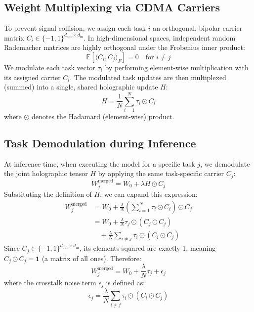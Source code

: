 \documentclass{article}
\begin{document}
\subsection{Weight Multiplexing via CDMA Carriers}
To prevent signal collision, we assign each task $i$ an orthogonal, bipolar carrier matrix $C_i \in \{-1, 1\}^{d_{\text{out}} \times d_{\text{in}}}$. In high-dimensional spaces, independent random Rademacher matrices are highly orthogonal under the Frobenius inner product:
\begin{equation}
    \mathbb{E}[\langle C_i, C_j \rangle_F] = 0 \quad \text{for } i \neq j
\end{equation}
We modulate each task vector $\tau_i$ by performing element-wise multiplication with its assigned carrier $C_i$. The modulated task updates are then multiplexed (summed) into a single, shared holographic update $H$:
\begin{equation}
    H = \frac{1}{N} \sum_{i=1}^N \tau_i \odot C_i
\end{equation}
where $\odot$ denotes the Hadamard (element-wise) product.

\subsection{Task Demodulation during Inference}
At inference time, when executing the model for a specific task $j$, we demodulate the joint holographic tensor $H$ by applying the same task-specific carrier $C_j$:
\begin{equation}
    W_j^{\text{merged}} = W_0 + \lambda H \odot C_j
\end{equation}
Substituting the definition of $H$, we can expand this expression:
\begin{align}
    W_j^{\text{merged}} &= W_0 + \frac{\lambda}{N} \left( \sum_{i=1}^N \tau_i \odot C_i \right) \odot C_j \\
    &= W_0 + \frac{\lambda}{N} \tau_j \odot (C_j \odot C_j) \nonumber \\
    &\quad + \frac{\lambda}{N} \sum_{i \neq j} \tau_i \odot (C_i \odot C_j)
\end{align}
Since $C_j \in \{-1, 1\}^{d_{\text{out}} \times d_{\text{in}}}$, its elements squared are exactly 1, meaning $C_j \odot C_j = \mathbf{1}$ (a matrix of all ones). Therefore:
\begin{equation}
    W_j^{\text{merged}} = W_0 + \frac{\lambda}{N} \tau_j + \epsilon_j
\end{equation}
where the crosstalk noise term $\epsilon_j$ is defined as:
\begin{equation}
    \epsilon_j = \frac{\lambda}{N} \sum_{i \neq j} \tau_i \odot (C_i \odot C_j)
\end{equation}
\end{document}
